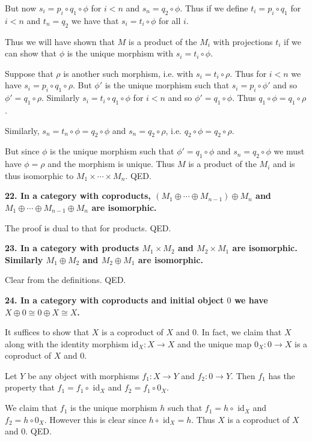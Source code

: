 \documentclass[12pt]{article}
\begin{document}
But now $s_i = p_i\circ q_1\circ \phi$ for $i < n$ and $s_n = q_2\circ \phi$. Thus if we define $t_i = p_i\circ q_1$ for $i < n$ and $t_n = q_2$ we have that $s_i = t_i\circ \phi$ for all $i$.

Thus we will have shown that $M$ is a product of the $M_i$ with projections $t_i$ if we can show that $\phi$ is the unique morphism with $s_i = t_i\circ \phi$.

Suppose that $\rho$ is another such morphism, i.e. with $s_i = t_i\circ \rho$. Thus for $i < n$ we have $s_i = p_i\circ q_1\circ \rho$. But $\phi'$ is the unique morphism such that $s_i = p_i\circ \phi'$ and so $\phi' = q_1\circ \rho$. Similarly $s_i = t_i\circ q_1\circ \phi$ for $i < n$ and so $\phi' = q_1\circ \phi$. Thus $q_1\circ \phi = q_1\circ \rho$.

Similarly, $s_n = t_n\circ \phi = q_2\circ \phi$ and $s_n = q_2\circ \rho$, i.e. $q_2\circ \phi = q_2\circ \rho$.

But since $\phi$ is the unique morphism such that $\phi' = q_1\circ \phi$ and $s_n = q_2\circ \phi$ we must have $\phi = \rho$ and the morphism is unique. Thus $M$ is a product of the $M_i$ and is thus isomorphic to $M_1\times \cdots \times M_n$. QED.

\textbf{22. In a category with coproducts, $(M_1\oplus \cdots \oplus M_{n-1})\oplus M_n$ and $M_1\oplus \cdots \oplus M_{n-1}\oplus M_n$ are isomorphic.}

The proof is dual to that for products. QED.

\textbf{23. In a category with products $M_1\times M_2$ and $M_2\times
 M_1$ are isomorphic. Similarly $M_1\oplus M_2$ and $M_2\oplus M_1$ are isomorphic.}

Clear from the definitions. QED.

\textbf{24. In a category with coproducts and initial object $0$ we have $X\oplus 0 \cong 0 \oplus X \cong X$.}

It suffices to show that $X$ is a coproduct of $X$ and $0$. In fact, we claim that $X$ along with the identity morphism id$_X : X \to X$ and the unique map $0_X : 0 \to X$ is a coproduct of $X$ and $0$.

Let $Y$ be any object with morphisms $f_1 : X \to Y$ and $f_2 : 0 \to Y$. Then $f_1$ has the property that $f_1 = f_1\circ$ id$_X$ and $f_2 = f_1\circ 0_X$.

We claim that $f_1$ is the unique morphism $h$ such that $f_1 = h\circ$ id$_X$ and $f_2 = h\circ 0_X$. However this is clear since $h\circ$ id$_X = h$. Thus $X$ is a coproduct of $X$ and $0$. QED.
\end{document}
